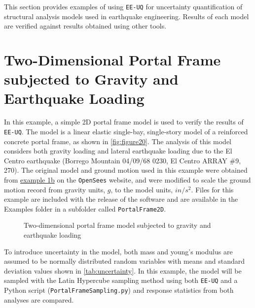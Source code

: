 This section provides examples of using \texttt{EE-UQ} for uncertainty
quantification of structural analysis models used in earthquake
engineering. Results of each model are verified against results
obtained using other tools.

\section{Two-Dimensional Portal Frame subjected to Gravity and Earthquake Loading}
In this example, a simple 2D portal frame model is used to verify the
results of \texttt{EE-UQ}. The model is a linear elastic single-bay,
single-story model of a reinforced concrete portal frame, as shown in
\autoref{fig:figure20}. The analysis of this model considers both
gravity loading and lateral earthquake loading due to the El Centro
earthquake (Borrego Mountain 04/09/68 0230, El Centro ARRAY \#9, 270).
The original model and ground motion used in this example were
obtained from
\href{http://opensees.berkeley.edu/wiki/index.php/OpenSees_Example_1b._Elastic_Portal_Frame}{example 1b} on the \texttt{OpenSees} website, 
and were modified to scale the ground motion record from gravity units, $g$,
to the model units, $in/s^2$. Files for this example are included
with the release of the software and are available in the Examples
folder in a subfolder called \texttt{PortalFrame2D}.

\begin{figure}[!htbp]
  \caption{Two-dimensional portal frame model subjected to gravity and earthquake loading}
  \label{fig:figure20}
\end{figure}

To introduce uncertainty in the model, both mass and young’s modulus
are assumed to be normally distributed random variables with means and
standard deviation values shown in \autoref{tab:uncertainty}. In this
example, the model will be sampled with the Latin Hypercube sampling
method using both \texttt{EE-UQ} and a Python script
(\texttt{PortalFrameSampling.py}) and response statistics from both
analyses are compared.

